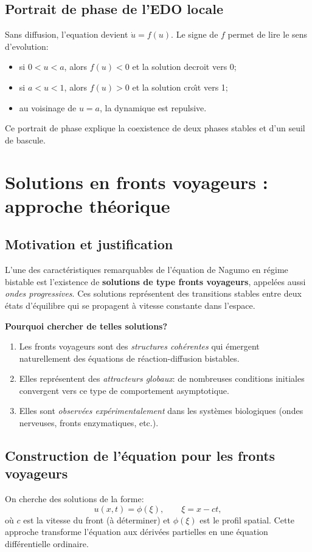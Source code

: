 \documentclass[11pt,a4paper]{report}
\begin{document}
\subsection*{Portrait de phase de l'EDO locale}
Sans diffusion, l'equation devient $\dot u=f(u)$.
Le signe de $f$ permet de lire le sens d'evolution:
\begin{itemize}[leftmargin=1.5em]
  \item si $0<u<a$, alors $f(u)<0$ et la solution decroit vers 0;
  \item si $a<u<1$, alors $f(u)>0$ et la solution cro\^{\i}t vers 1;
  \item au voisinage de $u=a$, la dynamique est repulsive.
\end{itemize}
Ce portrait de phase explique la coexistence de deux phases stables et d'un seuil de bascule.

\section{Solutions en fronts voyageurs : approche théorique}
\subsection*{Motivation et justification}
L'une des caractéristiques remarquables de l'équation de Nagumo en régime bistable
est l'existence de \textbf{solutions de type fronts voyageurs}, appelées aussi \textit{ondes progressives}.
Ces solutions représentent des transitions stables entre deux états d'équilibre qui se propagent
à vitesse constante dans l'espace.

\textbf{Pourquoi chercher de telles solutions?}
\begin{enumerate}[leftmargin=2em]
  \item Les fronts voyageurs sont des \textit{structures cohérentes} qui émergent naturellement
        des équations de réaction-diffusion bistables.
  \item Elles représentent des \textit{attracteurs globaux}: de nombreuses conditions initiales
        convergent vers ce type de comportement asymptotique.
  \item Elles sont \textit{observées expérimentalement} dans les systèmes biologiques
        (ondes nerveuses, fronts enzymatiques, etc.).
\end{enumerate}

\subsection*{Construction de l'équation pour les fronts voyageurs}
On cherche des solutions de la forme:
\begin{equation}
 u(x,t) = \phi(\xi), \qquad \xi = x - ct,
\end{equation}
où $c$ est la vitesse du front (à déterminer) et $\phi(\xi)$ est le profil spatial.
Cette approche transforme l'équation aux dérivées partielles en une équation différentielle ordinaire.
\end{document}
